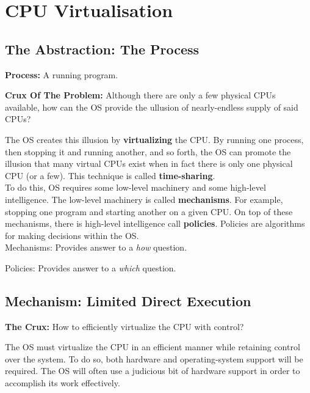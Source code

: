 \chapter{CPU Virtualisation}

\section{The Abstraction: The Process}

\textbf{Process:} A running program.\\

\begin{tcolorbox}
    \textbf{Crux Of The Problem:} Although there are only a few physical CPUs
    available, how can the OS provide the ullusion of nearly-endless supply of 
    said CPUs?\\
\end{tcolorbox}

The OS creates this illusion by \textbf{virtualizing} the CPU. By running
one process, then stopping it and running another, and so forth, the OS can
promote the illusion that many virtual CPUs exist when in fact there is only
one physical CPU (or a few). This technique is called \textbf{time-sharing}.\\

To do this, OS requires some low-level machinery and some
high-level intelligence. The low-level machinery is called \textbf{mechanisms}.
For example, stopping one program and starting another on a given CPU. On top
of these mechanisms, there is high-level intelligence call \textbf{policies}.
Policies are algorithms for making decisions within the OS.\\

Mechanisms: Provides answer to a \textit{how} question.

Policies: Provides answer to a \textit{which} question.\\

\section{Mechanism: Limited Direct Execution}

\begin{tcolorbox}
    \textbf{The Crux:} How to efficiently virtualize the CPU with control?
\end{tcolorbox}

The OS must virtualize the CPU in an efficient manner while retaining control
over the system. To do so, both hardware and operating-system support will be
required. The OS will often use a judicious bit of hardware support in order to
accomplish its work effectively.

